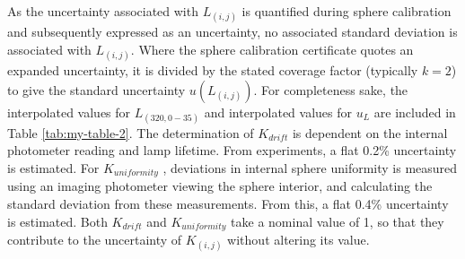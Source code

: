 \documentclass[nohyper,nobib]{tufte-book}
\begin{document}
As the uncertainty associated with $L_{(i,j)}$ is quantified during sphere calibration and subsequently expressed as an uncertainty, no associated standard deviation is associated with $L_{(i,j)}$. Where the sphere calibration certificate quotes an expanded uncertainty, it is divided by the stated coverage factor (typically $k = 2$) to give the standard uncertainty $u(L_{(i,j)})$. For completeness sake, the interpolated values for $L_{(320,0-35)}$ and interpolated values for $u_{L}$ are included in Table \ref{tab:my-table-2}. The determination of $K_{drift}$ is dependent on the internal photometer reading and lamp lifetime. From experiments, a flat 0.2\% uncertainty is estimated. For $K_{uniformity}$ , deviations in internal sphere uniformity is measured using an imaging photometer viewing the sphere interior, and calculating the standard deviation from these measurements. From this, a flat 0.4\% uncertainty is estimated. Both $K_{drift}$ and $K_{uniformity}$ take a nominal value of 1, so that they contribute to the uncertainty of $K_{(i,j)}$ without altering its value. 
\end{document}
